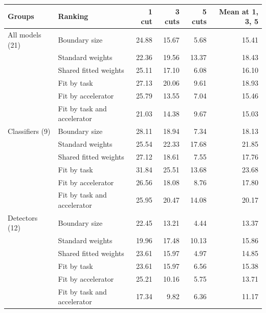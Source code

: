 \begin{tabular}{@{}llrrrr@{}}
\toprule
Groups & Ranking & 1 cut & 3 cuts & 5 cuts & Mean at 1, 3, 5 \\
\midrule
All models (21) & Boundary size & 24.88 & 15.67 & 5.68 & 15.41 \\
 & Standard weights & 22.36 & 19.56 & 13.37 & 18.43 \\
 & Shared fitted weights & 25.11 & 17.10 & 6.08 & 16.10 \\
 & Fit by task & 27.13 & 20.06 & 9.61 & 18.93 \\
 & Fit by accelerator & 25.79 & 13.55 & 7.04 & 15.46 \\
 & Fit by task and accelerator & 21.03 & 14.38 & 9.67 & 15.03 \\
\midrule
Classifiers (9) & Boundary size & 28.11 & 18.94 & 7.34 & 18.13 \\
 & Standard weights & 25.54 & 22.33 & 17.68 & 21.85 \\
 & Shared fitted weights & 27.12 & 18.61 & 7.55 & 17.76 \\
 & Fit by task & 31.84 & 25.51 & 13.68 & 23.68 \\
 & Fit by accelerator & 26.56 & 18.08 & 8.76 & 17.80 \\
 & Fit by task and accelerator & 25.95 & 20.47 & 14.08 & 20.17 \\
\midrule
Detectors (12) & Boundary size & 22.45 & 13.21 & 4.44 & 13.37 \\
 & Standard weights & 19.96 & 17.48 & 10.13 & 15.86 \\
 & Shared fitted weights & 23.61 & 15.97 & 4.97 & 14.85 \\
 & Fit by task & 23.61 & 15.97 & 6.56 & 15.38 \\
 & Fit by accelerator & 25.21 & 10.16 & 5.75 & 13.71 \\
 & Fit by task and accelerator & 17.34 & 9.82 & 6.36 & 11.17 \\
\bottomrule
\end{tabular}

